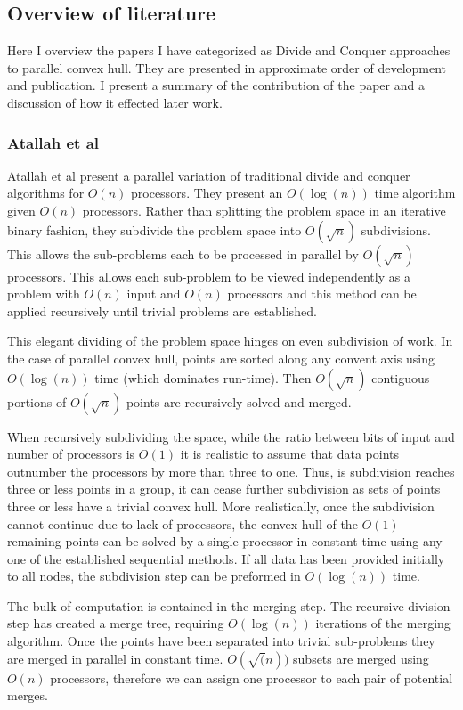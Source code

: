 \documentclass[10pt,a4paper]{report}
\begin{document}
\subsection{Overview of literature}
Here I overview the papers I have categorized as Divide and Conquer approaches to parallel convex hull. They are presented in approximate order of development and publication. I present a summary of the contribution of the paper and a discussion of how it effected later work.


\subsubsection{Atallah et al}
Atallah et al\cite{Atallah1986Efficient} present a parallel variation of traditional divide and conquer algorithms for $O(n)$ processors. They present an $O(\log(n))$ time algorithm given $O(n)$ processors. Rather than splitting the problem space in an iterative binary fashion, they subdivide the problem space into $O(\sqrt{n})$ subdivisions. This allows the sub-problems each to be processed in parallel by $O(\sqrt{n})$ processors. This allows each sub-problem to be viewed independently as a problem with $O(n)$ input and $O(n)$ processors and this method can be applied recursively until trivial problems are established.

This elegant dividing of the problem space hinges on even subdivision of work. In the case of parallel convex hull, points are sorted along any convent axis using $O(\log(n))$ time (which dominates run-time).
Then $O(\sqrt{n})$ contiguous portions of $O(\sqrt{n})$ points are recursively solved and merged.

When recursively subdividing the space, while the ratio between bits of input and number of processors is $O(1)$ it is realistic to assume that data points outnumber the processors by more than three to one.
Thus, is subdivision reaches three or less points in a group, it can cease further subdivision as sets of points three or less have a trivial convex hull.
More realistically, once the subdivision cannot continue due to lack of processors, the convex hull of the $O(1)$ remaining points can be solved by a single processor in constant time using any one of the established sequential methods.
If all data has been provided initially to all nodes, the subdivision step can be preformed in $O(\log(n))$ time.


The bulk of computation is contained in the merging step. The recursive division step has created a merge tree, requiring $O(\log(n))$ iterations of the merging algorithm.
Once the points have been separated into trivial sub-problems they are merged in parallel in constant time. $O(\sqrt(n))$ subsets are merged using $O(n)$ processors, therefore we can assign one processor to each pair of potential merges.
\end{document}
